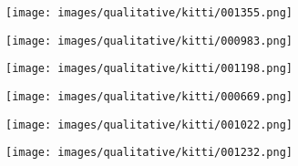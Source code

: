 \documentclass[runningheads]{llncs}
\newcommand{\figureScaleFraction}{1.0}
\newcommand{\kitti}{KITTI}
\newcommand{\gupNet}{GUP Net}
\newcommand{\methodName}{DEVIANT}
\begin{document}
        \begin{figure*}[!tb]
            \centering
            \begin{subfigure}{\figureScaleFraction\linewidth}
                \texttt{[image: images/qualitative/kitti/001355.png]}
            \end{subfigure}
            \begin{subfigure}{\figureScaleFraction\linewidth}
                \texttt{[image: images/qualitative/kitti/000983.png]}
            \end{subfigure}
            \begin{subfigure}{\figureScaleFraction\linewidth}
                \texttt{[image: images/qualitative/kitti/001198.png]}
            \end{subfigure}
            \begin{subfigure}{\figureScaleFraction\linewidth}
                \texttt{[image: images/qualitative/kitti/000669.png]}
            \end{subfigure}
            \begin{subfigure}{\figureScaleFraction\linewidth}
                \texttt{[image: images/qualitative/kitti/001022.png]}
            \end{subfigure}
            \begin{subfigure}{\figureScaleFraction\linewidth}
                \texttt{[image: images/qualitative/kitti/001232.png]}
            \end{subfigure}
            \caption{\textbf{\kitti{} Qualitative Results}. 
            \methodName{} predictions in general are more accurate than \textcolor{set1_cyan}{\gupNet} \cite{lu2021geometry}.
            [Key: \textcolor{my_magenta}{Cars}, \textcolor{orange}{Cyclists} and \textcolor{violet}{Pedestrians} of \methodName; \textcolor{set1_cyan}{all classes of \gupNet}, and \textcolor{my_green}{Ground Truth} in BEV]. }
            \label{fig:qualitative_kitti}
        \end{figure*}
\end{document}
